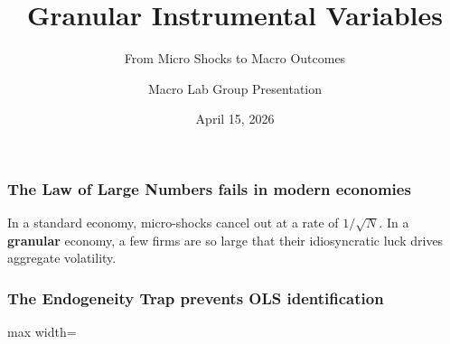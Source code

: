 \documentclass[aspectratio=169,11pt]{beamer}
\begin{document}
\begin{frame}[plain]
    \title{Granular Instrumental Variables}
    \subtitle{From Micro Shocks to Macro Outcomes}
    \author{Macro Lab Group Presentation}
    \date{April 15, 2026}
    \titlepage
\end{frame}


\begin{frame}
    \frametitle{The Law of Large Numbers fails in modern economies}
    \vspace{1cm}
    {\Large
        In a standard economy, micro-shocks cancel out at a rate of $1/\sqrt{N}$.
    }
    \vspace{1cm}
    {\Large
        In a \textbf{granular} economy, a few firms are so large that their idiosyncratic luck drives aggregate volatility.
    }
\end{frame}

\begin{frame}
    \frametitle{The Endogeneity Trap prevents OLS identification}
    \vspace{0.5cm}
    \begin{center}
        \begin{adjustbox}{max width=\textwidth}
        \end{adjustbox}
    \end{center}
\end{frame}
\end{document}
